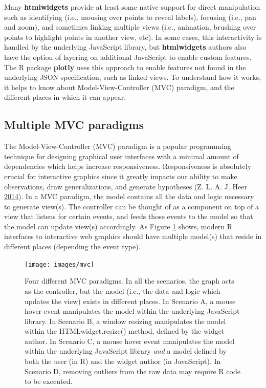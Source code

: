 \documentclass[12pt,]{isuthesis}
\begin{document}
Many \textbf{htmlwidgets} provide at least some native support for
direct manipulation such as identifying (i.e., mousing over points to
reveal labels), focusing (i.e., pan and zoom), and sometimes linking
multiple views (i.e., animation, brushing over points to highlight
points in another view, etc). In some cases, this interactivity is
handled by the underlying JavaScript library, but \textbf{htmlwidgets}
authors also have the option of layering on additional JavaScript to
enable custom features. The R package \textbf{plotly} uses this approach
to enable features not found in the underlying JSON specification, such
as linked views. To understand how it works, it helps to know about
Model-View-Controller (MVC) paradigm, and the different places in which
it can appear.

\subsection{Multiple MVC paradigms}\label{multiple-mvc-paradigms}

The Model-View-Controller (MVC) paradigm is a popular programming
technique for designing graphical user interfaces with a minimal amount
of dependencies which helps increase responsiveness. Responsiveness is
absolutely crucial for interactive graphics since it greatly impacts our
ability to make observations, draw generalizations, and generate
hypotheses (Z. L. A. J. Heer
\protect\hyperlink{ref-2014-latency}{2014}). In a MVC paradigm, the
model contains all the data and logic necessary to generate view(s). The
controller can be thought of as a component on top of a view that
listens for certain events, and feeds those events to the model so that
the model can update view(s) accordingly. As Figure \ref{fig:mvc} shows,
modern R interfaces to interactive web graphics should have multiple
model(s) that reside in different places (depending the event type).

\begin{figure}[htbp]
\centering
\texttt{[image: images/mvc]}
\caption{\label{fig:mvc}Four different MVC paradigms. In all the scenarios,
the graph acts as the controller, but the model (i.e., the data and
logic which updates the view) exists in different places. In Scenario A,
a mouse hover event manipulates the model within the underlying
JavaScript library. In Scenario B, a window resizing manipulates the
model within the HTMLwidget.resize() method, defined by the widget
author. In Scenario C, a mouse hover event manipulates the model within
the underlying JavaScript library \emph{and} a model defined by both the
user (in R) and the widget author (in JavaScript). In Scenario D,
removing outliers from the raw data may require R code to be executed.}
\end{figure}
\end{document}
